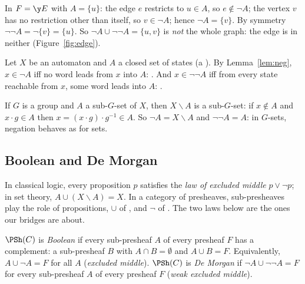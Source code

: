 \begin{example}
In $F = \y E$ with $A = \{u\}$: the edge $e$ restricts to $u\in A$, so $e\notin\neg A$; the vertex $v$ has no restriction other than itself, so $v\in\neg A$; hence $\neg A = \{v\}$. By symmetry $\neg\neg A = \neg\{v\} = \{u\}$. So $\neg A\cup\neg\neg A = \{u,v\}$ is \emph{not} the whole graph: the edge is in neither (Figure~\ref{fig:edge}).
\end{example}

\begin{example}[Automata]\label{ex:automataneg}
Let $X$ be an automaton and $A$ a closed set of states (a ). By Lemma~\ref{lem:neg}, $x\in\neg A$ iff no word leads from $x$ into $A$: . And $x\in\neg\neg A$ iff from every state reachable from $x$, some word leads into $A$: .
\end{example}

\begin{example}[$G$-sets]
If $G$ is a group and $A$ a sub-$G$-set of $X$, then $X\smallsetminus A$ is a sub-$G$-set: if $x\notin A$ and $x\cdot g\in A$ then $x = (x\cdot g)\cdot g^{-1}\in A$. So $\neg A = X\smallsetminus A$ and $\neg\neg A = A$: in $G$-sets, negation behaves as for sets.
\end{example}

\subsection{Boolean and De Morgan}

In classical logic, every proposition $p$ satisfies the \emph{law of excluded middle} $p\vee\neg p$; in set theory, $A\cup(X\smallsetminus A) = X$. In a category of presheaves, sub-presheaves play the role of propositions, $\cup$ of , and $\neg$ of . The two laws below are the ones our bridges are about.

\begin{definition}
$\PSh(C)$ is \emph{Boolean} if every sub-presheaf $A$ of every presheaf $F$ has a complement: a sub-presheaf $B$ with $A\cap B=\emptyset$ and $A\cup B = F$. Equivalently, $A\cup\neg A = F$ for all $A$ (\emph{excluded middle}).
$\PSh(C)$ is \emph{De Morgan} if $\neg A\cup\neg\neg A = F$ for every sub-presheaf $A$ of every presheaf $F$ (\emph{weak excluded middle}).
\end{definition}

